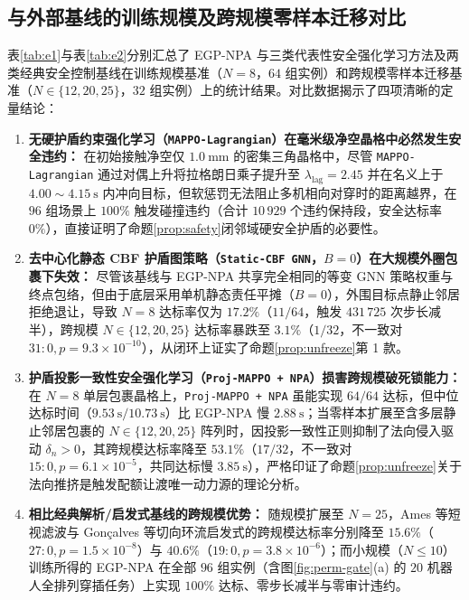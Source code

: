 \subsection{与外部基线的训练规模及跨规模零样本迁移对比}
表\ref{tab:e1}与表\ref{tab:e2}分别汇总了 EGP-NPA 与三类代表性安全强化学习方法及两类经典安全控制基线在训练规模基准（$N=8$，$64$ 组实例）和跨规模零样本迁移基准（$N\in\{12,20,25\}$，$32$ 组实例）上的统计结果。对比数据揭示了四项清晰的定量结论：
\begin{enumerate}
 \item \textbf{无硬护盾约束强化学习（\texttt{MAPPO-Lagrangian}\cite{gu2023safe}）在毫米级净空晶格中必然发生安全违约：} 在初始接触净空仅 $1.0\ \mathrm{mm}$ 的密集三角晶格中，尽管 \texttt{MAPPO-Lagrangian} 通过对偶上升将拉格朗日乘子提升至 $\lambda_{\mathrm{lag}}=2.45$ 并在名义上于 $4.00\sim 4.15\ \mathrm s$ 内冲向目标，但软惩罚无法阻止多机相向对穿时的距离越界，在 $96$ 组场景上 $100\%$ 触发碰撞违约（合计 $10\,929$ 个违约保持段，安全达标率 $0\%$），直接证明了命题\ref{prop:safety}闭邻域硬安全护盾的必要性。
 \item \textbf{去中心化静态 CBF 护盾图策略（\texttt{Static-CBF GNN}\cite{zhang2025gcbf,zhang2025dgppo}，$B=0$）在大规模外圈包裹下失效：} 尽管该基线与 EGP-NPA 共享完全相同的等变 GNN 策略权重与终点包络，但由于底层采用单机静态责任平摊（$B=0$），外围目标点静止邻居拒绝退让，导致 $N=8$ 达标率仅为 $17.2\%$（$11/64$，触发 $431\,725$ 次步长减半），跨规模 $N\in\{12,20,25\}$ 达标率暴跌至 $3.1\%$（$1/32$，不一致对 $31:0,p=9.3\times 10^{-10}$），从闭环上证实了命题\ref{prop:unfreeze}第 1 款。
 \item \textbf{护盾投影一致性安全强化学习（\texttt{Proj-MAPPO + NPA}\cite{wabersich2021,liu2026saferl}）损害跨规模破死锁能力：} 在 $N=8$ 单层包裹晶格上，\texttt{Proj-MAPPO + NPA} 虽能实现 $64/64$ 达标，但中位达标时间（$9.53\ \mathrm s / 10.73\ \mathrm s$）比 EGP-NPA 慢 $2.88\ \mathrm s$；当零样本扩展至含多层静止邻居包裹的 $N\in\{12,20,25\}$ 阵列时，因投影一致性正则抑制了法向侵入驱动 $\delta_n>0$，其跨规模达标率降至 $53.1\%$（$17/32$，不一致对 $15:0,p=6.1\times 10^{-5}$，共同达标慢 $3.85\ \mathrm s$），严格印证了命题\ref{prop:unfreeze}关于法向推挤是触发配额让渡唯一动力源的理论分析。
 \item \textbf{相比经典解析/启发式基线的跨规模优势：} 随规模扩展至 $N=25$，Ames 等\cite{ames2017cbf,reis2021}短视滤波与 Gon\c{c}alves 等\cite{goncalves2023circulation}切向环流启发式的跨规模达标率分别降至 $15.6\%$（$27:0,p=1.5\times 10^{-8}$）与 $40.6\%$（$19:0,p=3.8\times 10^{-6}$）；而小规模（$N\le 10$）训练所得的 EGP-NPA 在全部 $96$ 组实例（含图\ref{fig:perm-gate}(a) 的 $20$ 机器人全排列穿插任务）上实现 $100\%$ 达标、零步长减半与零审计违约。
\end{enumerate}

